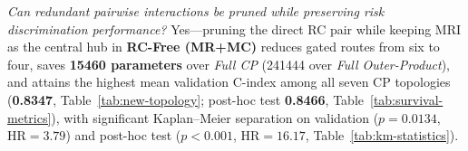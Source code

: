 \begin{description}[leftmargin=1.35cm,labelwidth=1.1cm,itemsep=.4em]
\item[RQ5.] \emph{Can redundant pairwise interactions be pruned while preserving risk discrimination performance?} Yes---pruning the direct RC pair while keeping MRI as the central hub in \textbf{RC-Free (MR+MC)} reduces gated routes from six to four, saves \textbf{15460 parameters} over \emph{Full CP} (241444 over \emph{Full Outer-Product}), and attains the highest mean validation C-index among all seven CP topologies (\textbf{0.8347}, Table~\ref{tab:new-topology}; post-hoc test \textbf{0.8466}, Table~\ref{tab:survival-metrics}), with significant Kaplan--Meier separation on validation ($p=0.0134$, $\mathrm{HR}=3.79$) and post-hoc test ($p<0.001$, $\mathrm{HR}=16.17$, Table~\ref{tab:km-statistics}).
\end{description}
